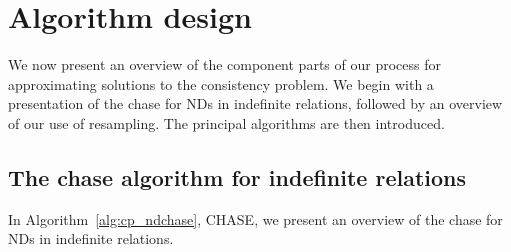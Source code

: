 \section{Algorithm design}\label{sec:algdes}

We now present an overview of the component parts of our process for
approximating solutions to the consistency problem. We begin with a
presentation of the chase for NDs in indefinite relations, followed by
an overview of our use of resampling.  The principal algorithms are
then introduced.

\subsection{The chase algorithm for indefinite
relations}\label{subsec:cp_ndchase}

In Algorithm~\ref{alg:cp_ndchase}, CHASE, we present an overview of the chase
for NDs in indefinite relations.

